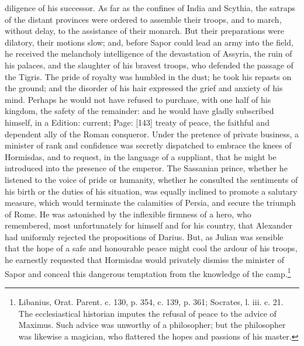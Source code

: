 diligence of his successor. As far as the confines of India and Scythia, the satraps of the distant provinces were ordered to assemble their troops, and to march, without delay, to the assistance of their monarch. But their preparations were dilatory, their motions slow; and, before Sapor could lead an army into the field, he received the melancholy intelligence of the devastation of Assyria, the ruin of his palaces, and the slaughter of his bravest troops, who defended the passage of the Tigris. The pride of royalty was humbled in the dust; he took his repasts on the ground; and the disorder of his hair expressed the grief and anxiety of his mind. Perhaps he would not have refused to purchase, with one half of his kingdom, the safety of the remainder: and he would have gladly subscribed himself, in a Edition: current; Page: [143] treaty of peace, the faithful and dependent ally of the Roman conqueror. Under the pretence of private business, a minister of rank and confidence was secretly dispatched to embrace the knees of Hormisdas, and to request, in the language of a suppliant, that he might be introduced into the presence of the emperor. The Sassanian prince, whether he listened to the voice of pride or humanity, whether he consulted the sentiments of his birth or the duties of his situation, was equally inclined to promote a salutary measure, which would terminate the calamities of Persia, and secure the triumph of Rome. He was astonished by the inflexible firmness of a hero, who remembered, most unfortunately for himself and for his country, that Alexander had uniformly rejected the propositions of Darius. But, as Julian was sensible that the hope of a safe and honourable peace might cool the ardour of his troops, he earnestly requested that Hormisdas would privately dismiss the minister of Sapor and conceal this dangerous temptation from the knowledge of the camp.\footnote{Libanius, Orat. Parent. c. 130, p. 354, c. 139, p. 361; Socrates, l. iii. c. 21. The ecclesiastical historian imputes the refusal of peace to the advice of Maximus. Such advice was unworthy of a philosopher; but the philosopher was likewise a magician, who flattered the hopes and passions of his master.}


